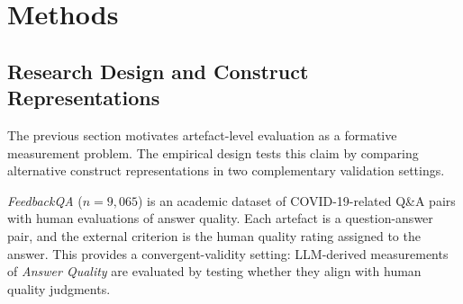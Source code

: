 
\section{Methods}\label{sec:methods}




\subsection{Research Design and Construct Representations}\label{sec:methods_design}

The previous section motivates artefact-level evaluation as a formative measurement problem. The empirical design tests this claim by comparing alternative construct representations in two complementary validation settings.

\textit{FeedbackQA} \citep{li_using_2022} ($n=9{,}065$) is an academic dataset of COVID-19-related Q\&A pairs with human evaluations of answer quality. Each artefact is a question-answer pair, and the external criterion is the human quality rating assigned to the answer. This provides a convergent-validity setting: LLM-derived measurements of \textit{Answer Quality} are evaluated by testing whether they align with human quality judgments.

